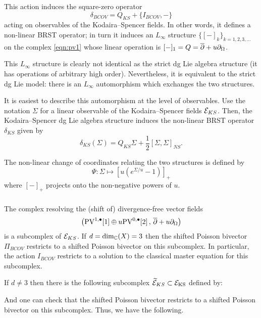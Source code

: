 \documentclass[11pt]{amsart}
\begin{document}
This action induces the square-zero operator 
\[
\delta_{BCOV} = Q_{KS} + \{I_{BCOV}, -\} 
\]
acting on observables of the Kodaira--Spencer fields. 
In other words, it defines a non-linear BRST operator; in turn it
induces an $L_\infty$ structure $\{[-]_k\}_{k =1,2,3,\ldots}$ on the complex \eqref{eqn:pv1} whose linear operation is $[-]_1 = Q = \overline{\partial} + u\partial_{\Omega}$. 

This $L_\infty$ structure is clearly not identical as the strict dg Lie algebra structure (it has operations of arbitrary high order). 
Nevertheless, it is equivalent to the strict dg Lie model: there is an $L_\infty$ automorphism which exchanges the two structures.

It is easiest to describe this automorphism at the level of observables.
Use the notation $\Sigma$ for a linear observable of the Kodaira--Spencer fields $\mathcal E_{KS}$. 
Then, the Kodaira--Spencer dg Lie algebra structure induces the non-linear BRST operator $\delta_{KS}$ given by
\[
\delta_{KS} (\Sigma) = Q_{KS} \Sigma + \frac12 [\Sigma,\Sigma]_{NS} .
\]

The non-linear change of coordinates relating the two structures is defined by
\[
\Psi \colon \Sigma \mapsto \left[u (e^{\Sigma/u} -1)\right]_+
\]
where $[-]_+$ projects onto the non-negative powers of $u$.  

\subsubsection{}

The complex resolving the (shift of) divergence-free vector fields 
\[
\left({\rm PV}^{1,\bullet}[1] \oplus u {\rm PV}^{0,\bullet}[2] \, , \, \overline{\partial} + u \partial_{\Omega}\right) 
\]
is a subcomplex of $\mathcal E_{KS}$.
If $d = \dim_\mathbb C(X)=3$ then the shifted Poisson bivector $\Pi_{BCOV}$ restricts to a shifted Poisson bivector on this subcomplex. 
In particular, the action $I_{BCOV}$ restricts to a solution to the classical master equation for this subcomplex. 

If $d \ne 3$ then there is the following subcomplex $\widetilde{\mathcal E}_{KS}\subset \mathcal E_{\rm KS}$ defined by:
\beqn\label{eqn:tilks}
\eeqn
And one can check that the shifted Poisson bivector restricts to a shifted Poisson bivector on this subcomplex. 
Thus, we have the following.
\end{document}
